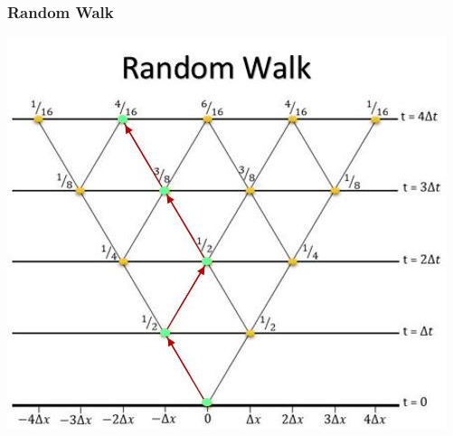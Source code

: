 \begin{frame}
  \frametitle{Random Walk}
  \centering
  \includegraphics[scale=0.67]{RWPath}
\end{frame}